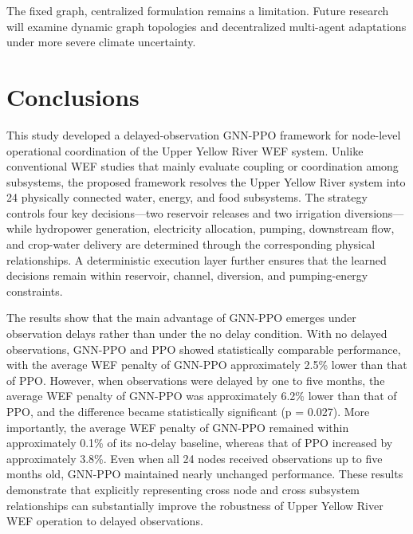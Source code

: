 \documentclass [a4paper,fleqn] {cas-dc}
\begin{document}
The fixed graph, centralized formulation remains a limitation. Future research will examine dynamic graph topologies and decentralized multi-agent adaptations under more severe climate uncertainty.

\section{Conclusions}
\label{sec6}

This study developed a delayed-observation GNN-PPO framework for node-level operational coordination of the Upper Yellow River WEF system. Unlike conventional WEF studies that mainly evaluate coupling or coordination among subsystems, the proposed framework resolves the Upper Yellow River system into 24 physically connected water, energy, and food subsystems. The strategy controls four key decisions—two reservoir releases and two irrigation diversions—while hydropower generation, electricity allocation, pumping, downstream flow, and crop-water delivery are determined through the corresponding physical relationships. A deterministic execution layer further ensures that the learned decisions remain within reservoir, channel, diversion, and pumping-energy constraints.

The results show that the main advantage of GNN-PPO emerges under observation delays rather than under the no delay condition. With no delayed observations, GNN-PPO and PPO showed statistically comparable performance, with the average WEF penalty of GNN-PPO approximately 2.5\% lower than that of PPO. However, when observations were delayed by one to five months, the average WEF penalty of GNN-PPO was approximately 6.2\% lower than that of PPO, and the difference became statistically significant (p = 0.027). More importantly, the average WEF penalty of GNN-PPO remained within approximately 0.1\% of its no-delay baseline, whereas that of PPO increased by approximately 3.8\%. Even when all 24 nodes received observations up to five months old, GNN-PPO maintained nearly unchanged performance. These results demonstrate that explicitly representing cross node and cross subsystem relationships can substantially improve the robustness of Upper Yellow River WEF operation to delayed observations.
\end{document}
